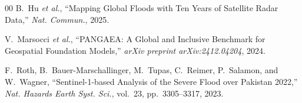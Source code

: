 \documentclass[conference]{IEEEtran}
\begin{document}
\begin{thebibliography}{00}
B.~Hu \textit{et al.}, ``Mapping Global Floods with Ten Years of Satellite Radar Data,'' \textit{Nat. Commun.}, 2025.

V.~Marsocci \textit{et al.}, ``PANGAEA: A Global and Inclusive Benchmark for Geospatial Foundation Models,'' \textit{arXiv preprint arXiv:2412.04204}, 2024.

F.~Roth, B.~Bauer-Marschallinger, M.~Tupas, C.~Reimer, P.~Salamon, and W.~Wagner, ``Sentinel-1-based Analysis of the Severe Flood over Pakistan 2022,'' \textit{Nat. Hazards Earth Syst. Sci.}, vol.~23, pp.~3305--3317, 2023.

\end{thebibliography}
\end{document}
